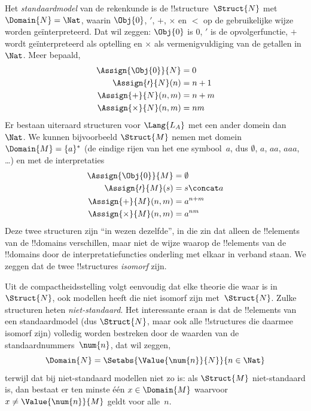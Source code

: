 \documentclass[openany]{memoir}
\begin{document}
Het \emph{standaardmodel} van de rekenkunde is de
!!{structure}~$\Struct{N}$ met $\Domain{N} = \Nat$, waarin
$\Obj{0}$, $\prime$, $+$, $\times$ en $<$ op de gebruikelijke wijze
worden geïnterpreteerd. Dat wil zeggen: $\Obj{0}$ is $0$, $\prime$ is de
opvolgerfunctie, $+$ wordt geïnterpreteerd als optelling en $\times$ als
vermenigvuldiging van de getallen in~$\Nat$. Meer bepaald,
\begin{align*}
  \Assign{\Obj{0}}{N} & = 0\\
  \Assign{\prime}{N}(n) & = n + 1\\
  \Assign{+}{N}(n, m) & = n + m\\
  \Assign{\times}{N}(n, m) & = nm
\end{align*}
Er bestaan uiteraard structuren voor $\Lang{L_A}$ met een ander domein
dan~$\Nat$. We kunnen bijvoorbeeld $\Struct{M}$ nemen met domein
$\Domain{M} = \{a\}^*$ (de eindige rijen van het ene
symbool~$a$, dus $\emptyset$, $a$, $aa$, $aaa$, \dots) en met de
interpretaties
\begin{align*}
  \Assign{\Obj{0}}{M} & = \emptyset\\
  \Assign{\prime}{M}(s) & = s \concat a\\
  \Assign{+}{M}(n, m) & = a^{n + m}\\
  \Assign{\times}{M}(n, m) & = a^{nm}
\end{align*}
Deze twee structuren zijn ``in wezen dezelfde'', in die zin dat alleen de
!!{element}s van de !!{domain}s verschillen, maar niet de wijze waarop de
!!{element}s van de !!{domain}s door de interpretatiefuncties onderling met
elkaar in verband staan. We zeggen dat de twee !!{structure}s
\emph{isomorf} zijn.

Uit de compactheidsstelling volgt eenvoudig dat elke theorie die waar is
in~$\Struct{N}$, ook modellen heeft die niet isomorf zijn
met~$\Struct{N}$. Zulke structuren heten \emph{niet-standaard}. Het
interessante eraan is dat de !!{element}s van een standaardmodel (dus
$\Struct{N}$, maar ook alle !!{structure}s die daarmee isomorf zijn)
volledig worden bestreken door de waarden van de
standaardnummers~$\num{n}$, dat wil zeggen,
\[
\Domain{N} = \Setabs{\Value{\num{n}}{N}}{n \in \Nat}
\]
terwijl dat bij niet-standaard modellen niet zo is: als $\Struct{M}$
niet-standaard is, dan bestaat er ten minste één $x \in \Domain{M}$ waarvoor
$x \neq \Value{\num{n}}{M}$ geldt voor alle~$n$.
\end{document}
